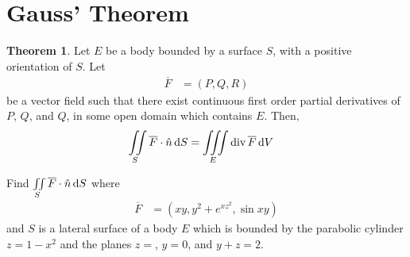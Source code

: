 \documentclass[fleqn, a4paper, 12pt, twoside]{article}
\theoremstyle{definition}
\theoremstyle{theorem}
\newtheorem{theorem}{Theorem}
\newcommand{\divergence}{\mathrm{div\,}}
\begin{document}
{\section{Gauss' Theorem}

\begin{theorem}
	Let $E$ be a body bounded by a surface $S$, with a positive orientation of $S$.
	Let
	\begin{align*}
		\overline{F} & = (P,Q,R)
	\end{align*}
	be a vector field such that there exist continuous first order partial derivatives of $P$, $Q$, and $Q$, in some open domain which contains $E$.
	Then,
	\begin{align*}
		\iint\limits_{S} \overline{F} \cdot \hat{n} \dif S & = \iiint\limits_{E} \divergence \overline{F} \dif V
	\end{align*}
	\label{Gauss's_Theorem}
\end{theorem}

\begin{question}
	Find $\iint\limits_{S} \overline{F} \cdot \hat{n} \dif S$ where
	\begin{align*}
		\overline{F} & = \left( x y , y^2 + e^{x z^2} , \sin x y \right)
	\end{align*}
	and $S$ is a lateral surface of a body $E$ which is bounded by the parabolic cylinder $z = 1 - x^2$ and the planes $z = $, $y = 0$, and $y + z = 2$.
\end{question}

}
\end{document}
